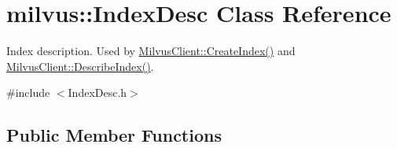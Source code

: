 \hypertarget{classmilvus_1_1_index_desc}{}\section{milvus\+:\+:Index\+Desc Class Reference}
\label{classmilvus_1_1_index_desc}


Index description. Used by \hyperlink{classmilvus_1_1_milvus_client_a9d56f35a497504a7dee610d368d22b7a}{Milvus\+Client\+::\+Create\+Index()} and \hyperlink{classmilvus_1_1_milvus_client_a58ed7015339719ab8dc7d6acad90d9a1}{Milvus\+Client\+::\+Describe\+Index()}.  




{\ttfamily \#include $<$Index\+Desc.\+h$>$}

\subsection*{Public Member Functions}
